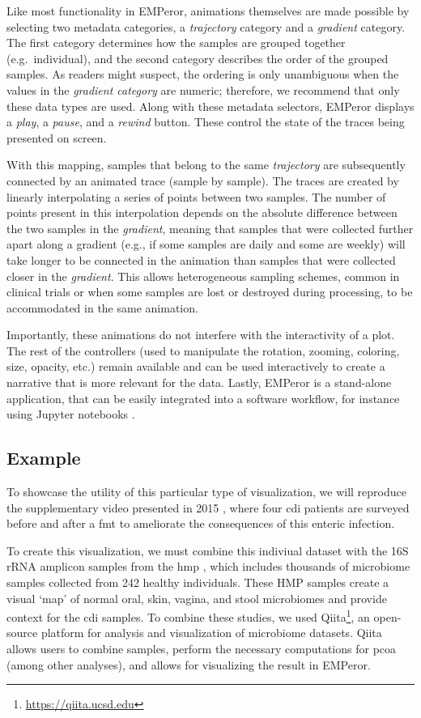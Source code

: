 Like most functionality in EMPeror, animations themselves are made possible by selecting two metadata categories, a \textit{trajectory} category and a \textit{gradient} category. The first category determines how the samples are grouped together (e.g.\ individual), and the second category describes the order of the grouped samples. As readers might suspect, the ordering is only unambiguous when the values in the \textit{gradient category} are numeric; therefore, we recommend that only these data types are used. Along with these metadata selectors, EMPeror displays a \textit{play}, a \textit{pause}, and a \textit{rewind} button. These control the state of the traces being presented on screen.

With this mapping, samples that belong to the same \textit{trajectory} are subsequently connected by an animated trace (sample by sample). The traces are created by linearly interpolating a series of points between two samples. The number of points present in this interpolation depends on the absolute difference between the two samples in the \textit{gradient}, meaning that samples that were collected further apart along a gradient (e.g., if some samples are daily and some are weekly) will take longer to be connected in the animation than samples that were collected closer in the \textit{gradient}. This allows heterogeneous sampling schemes, common in clinical trials or when some samples are lost or destroyed during processing, to be accommodated in the same animation.

Importantly, these animations do not interfere with the interactivity of a plot. The rest of the controllers (used to manipulate the rotation, zooming, coloring, size, opacity, etc.) remain available and can be used interactively to create a narrative that is more relevant for the data. Lastly, EMPeror is a stand-alone application, that can be easily integrated into a software workflow, for instance using Jupyter notebooks \cite{RN162}.

\subsection{Example}
To showcase the utility of this particular type of visualization, we will reproduce the supplementary video presented in 2015 \cite{RN1471}, where four \gls{cdi} patients are surveyed before and after a \gls{fmt} to ameliorate the consequences of this enteric infection.

To create  this visualization, we must combine this indiviual dataset with the 16S rRNA amplicon samples from the \gls{hmp} \cite{RN35}, which includes thousands of microbiome samples collected from 242 healthy individuals. These HMP samples create a visual `map' of normal oral, skin, vagina, and stool microbiomes and provide context for the \gls{cdi} samples. To combine these studies, we used  Qiita\footnote{\url{https://qiita.ucsd.edu}}, an open-source platform for analysis and visualization of microbiome datasets. Qiita allows users to combine samples, perform the necessary computations for \gls{pcoa} (among other analyses), and allows for visualizing the result in EMPeror. 

